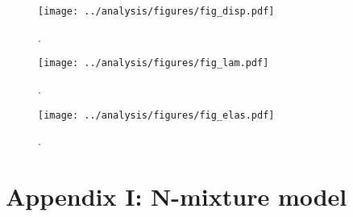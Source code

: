 \documentclass[11pt]{article}
\begin{document}
\clearpage
\begin{figure}
\centering
\texttt{[image: ../analysis/figures/fig\_disp.pdf]}
\caption{\label{fig:disp}
.
}
\end{figure}
\clearpage

\clearpage
\begin{figure}
\centering
\texttt{[image: ../analysis/figures/fig\_lam.pdf]}
\caption{\label{fig:lam}
.
}
\end{figure}
\clearpage

\clearpage
\begin{figure}
\centering
\texttt{[image: ../analysis/figures/fig\_elas.pdf]}
\caption{\label{fig:elas}
.
}
\end{figure}
\clearpage





\renewcommand{\thefigure}{A\arabic{figure}}
\renewcommand{\theequation}{A\arabic{equation}}
\renewcommand{\thetable}{A\arabic{table}}
\setcounter{equation}{0}
\setcounter{figure}{0}
\setcounter{table}{0}

\section*{Appendix I: N-mixture model} 
\end{document}
